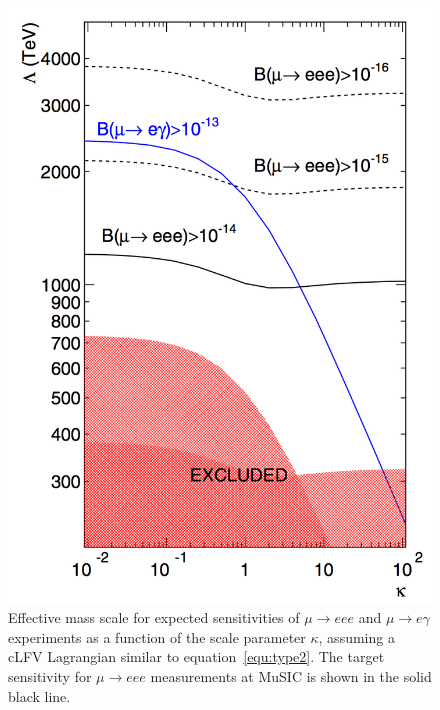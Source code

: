 \begin{figure}[h]
  \centering
    \includegraphics[width=.8\textwidth]{images/clfv_type2.png}
  \caption{Effective mass scale for expected sensitivities of \( \mu\rightarrow eee \) and \( \mu\rightarrow e\gamma \) experiments as a function of the scale parameter \( \kappa \), assuming a cLFV Lagrangian similar to equation~\eqref{equ:type2}. The target sensitivity for \( \mu\rightarrow eee \) measurements at MuSIC is shown in the solid black line.}
  \label{fig:images_clfv_type2}
\end{figure}


